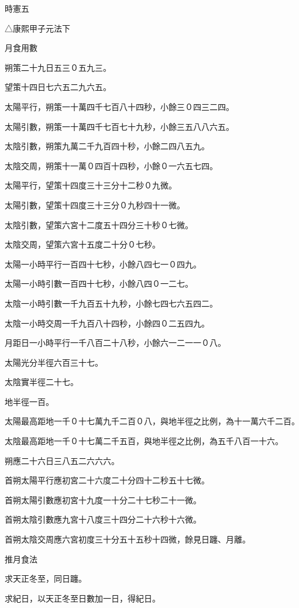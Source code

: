 
\begin{pinyinscope}
時憲五

△康熙甲子元法下

月食用數

朔策二十九日五三０五九三。

望策十四日七六五二九六五。

太陽平行，朔策一十萬四千七百八十四秒，小餘三０四三二四。

太陽引數，朔策一十萬四千七百七十九秒，小餘三五八八六五。

太陰引數，朔策九萬二千九百四十秒，小餘二四八五九。

太陰交周，朔策十一萬０四百十四秒，小餘０一六五七四。

太陽平行，望策十四度三十三分十二秒０九微。

太陽引數，望策十四度三十三分０九秒四十一微。

太陰引數，望策六宮十二度五十四分三十秒０七微。

太陰交周，望策六宮十五度二十分０七秒。

太陽一小時平行一百四十七秒，小餘八四七一０四九。

太陽一小時引數一百四十七秒，小餘八四０一二七。

太陰一小時引數一千九百五十九秒，小餘七四七六五四二。

太陰一小時交周一千九百八十四秒，小餘四０二五四九。

月距日一小時平行一千八百二十八秒，小餘六一二一一０八。

太陽光分半徑六百三十七。

太陰實半徑二十七。

地半徑一百。

太陽最高距地一千０十七萬九千二百０八，與地半徑之比例，為十一萬六千二百。

太陰最高距地一千０十七萬二千五百，與地半徑之比例，為五千八百一十六。

朔應二十六日三八五二六六六。

首朔太陽平行應初宮二十六度二十分四十二秒五十七微。

首朔太陽引數應初宮十九度一十分二十七秒二十一微。

首朔太陰引數應九宮十八度三十四分二十六秒十六微。

首朔太陰交周應六宮初度三十分五十五秒十四微，餘見日躔、月離。

推月食法

求天正冬至，同日躔。

求紀日，以天正冬至日數加一日，得紀日。


\end{pinyinscope}
